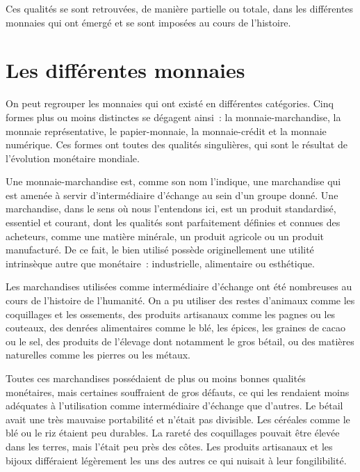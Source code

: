 Ces qualités se sont retrouvées, de manière partielle ou totale, dans les différentes monnaies qui ont émergé et se sont imposées au cours de l'histoire.

\section*{Les différentes monnaies}

On peut regrouper les monnaies qui ont existé en différentes catégories. Cinq formes plus ou moins distinctes se dégagent ainsi~: la monnaie-marchandise, la monnaie représentative, le papier-monnaie, la monnaie-crédit et la monnaie numérique. Ces formes ont toutes des qualités singulières, qui sont le résultat de l'évolution monétaire mondiale.


Une monnaie-marchandise est, comme son nom l'indique, une marchandise qui est amenée à servir d'intermédiaire d'échange au sein d'un groupe donné. Une marchandise, dans le sens où nous l'entendons ici, est un produit standardisé, essentiel et courant, dont les qualités sont parfaitement définies et connues des acheteurs, comme une matière minérale, un produit agricole ou un produit manufacturé. De ce fait, le bien utilisé possède originellement une utilité intrinsèque autre que monétaire~: industrielle, alimentaire ou esthétique.

Les marchandises utilisées comme intermédiaire d'échange ont été nombreuses au cours de l'histoire de l'humanité. On a pu utiliser des restes d'animaux comme les coquillages et les ossements, des produits artisanaux comme les pagnes ou les couteaux, des denrées alimentaires comme le blé, les épices, les graines de cacao ou le sel, des produits de l'élevage dont notamment le gros bétail, ou des matières naturelles comme les pierres ou les métaux.

Toutes ces marchandises possédaient de plus ou moins bonnes qualités monétaires, mais certaines souffraient de gros défauts, ce qui les rendaient moins adéquates à l'utilisation comme intermédiaire d'échange que d'autres. Le bétail avait une très mauvaise portabilité et n'était pas divisible. Les céréales comme le blé ou le riz étaient peu durables. La rareté des coquillages pouvait être élevée dans les terres, mais l'était peu près des côtes. Les produits artisanaux et les bijoux différaient légèrement les uns des autres ce qui nuisait à leur fongilibilité.

